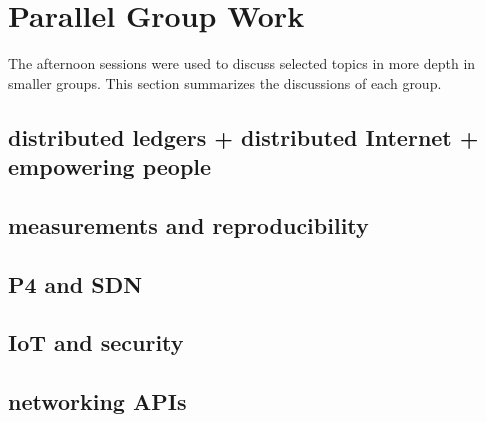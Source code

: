 \section{Parallel Group Work}\label{sec:parallel-group-work}

The afternoon sessions were used to discuss selected topics in more depth in
smaller groups. This section summarizes the discussions of each group.


\subsection{distributed ledgers + distributed Internet + empowering people}

\subsection{measurements and reproducibility}

\cite{fbai:infocom:2003}

\subsection{P4 and SDN}

\subsection{IoT and security}

\subsection{networking APIs}

